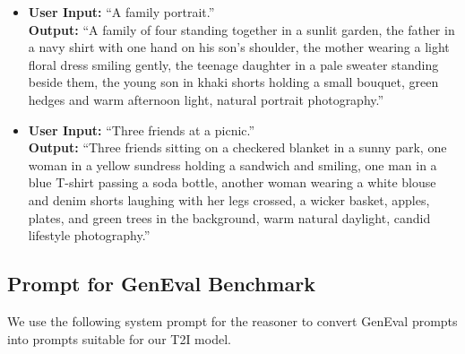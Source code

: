 \documentclass{llmxive}
\begin{document}
\begin{tcolorbox}
\begin{itemize}[leftmargin=1.5em, itemsep=0.3em, topsep=0.2em, parsep=0pt, partopsep=0pt]
    \item \textbf{User Input:} ``A family portrait.''\\
    \textbf{Output:} ``A family of four standing together in a sunlit garden, the father in a navy shirt with one hand on his son's shoulder, the mother wearing a light floral dress smiling gently, the teenage daughter in a pale sweater standing beside them, the young son in khaki shorts holding a small bouquet, green hedges and warm afternoon light, natural portrait photography.''

    \item \textbf{User Input:} ``Three friends at a picnic.''\\
    \textbf{Output:} ``Three friends sitting on a checkered blanket in a sunny park, one woman in a yellow sundress holding a sandwich and smiling, one man in a blue T-shirt passing a soda bottle, another woman wearing a white blouse and denim shorts laughing with her legs crossed, a wicker basket, apples, plates, and green trees in the background, warm natural daylight, candid lifestyle photography.''

\end{itemize}

\end{tcolorbox}


\subsection{Prompt for GenEval Benchmark}
\label{sec:prompt-geneval}
We use the following system prompt for the reasoner to convert GenEval prompts into prompts suitable for our T2I model.
\end{document}

